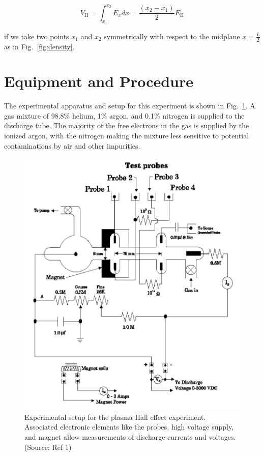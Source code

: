 \documentclass[%
 aip,
rsi,%
 amsmath,amssymb,
 reprint,%
author-numerical,%
]{revtex4-1}
\begin{document}
\begin{equation}
V _ { \mathrm { H } } = \int _ { x _ { 1 } } ^ { x _ { 2 } } E _ { x } d x  = \frac { ( x _ { 2 } - x _ { 1 } ) } { 2 } E _ { \mathrm { H } }
\label{eq:six}
\end{equation}

\noindent if we take two points $x _ { 1 }$ and $x _ { 2 }$ symmetrically with respect to the midplane $x=\frac{L}{2}$ as in Fig.~\ref{fig:density}. 


\section{Equipment and Procedure}
The experimental apparatus and setup for this experiment is shown in Fig.~\ref{fig:diagram}. A gas mixture of 98.8$\%$ helium, 1$\%$ argon, and 0.1$\%$ nitrogen is supplied to the discharge tube. The majority of the free electrons in the gas is supplied by the ionized argon, with the nitrogen making the mixture less sensitive to potential contaminations by air and other impurities. 

\begin{figure}
\includegraphics[width=0.5\linewidth]{lateximages/diagram.png} 
\caption{\label{fig:diagram} Experimental setup for the plasma Hall effect experiment. Associated electronic elements like the probes, high voltage supply, and magnet allow measurements of discharge currents and voltages. (Source: Ref 1)}
\end{figure}
\end{document}
